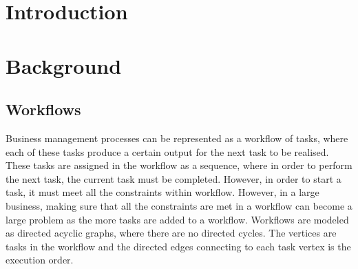 \documentclass[a4paper]{report}
\begin{document}
\tableofcontents

\chapter{Introduction}

\chapter{Background}
\section{Workflows}
\setlength{\parindent}{4em}
Business management processes can be represented as a workflow of tasks, where each of these tasks produce a certain output for the next task to be realised. These tasks are assigned in the workflow as a sequence, where in order to perform the next task, the current task must be completed. However, in order to start a task, it must meet all the constraints within workflow. However, in a large business, making sure that all the constraints are met in a workflow can become a large problem as the more tasks are added to a workflow.   Workflows are modeled as directed acyclic graphs\cite{AcyclicDigraph}, where there are no directed cycles. The vertices are tasks in the workflow and the directed edges connecting to each task vertex is the execution order. \par
\end{document}
